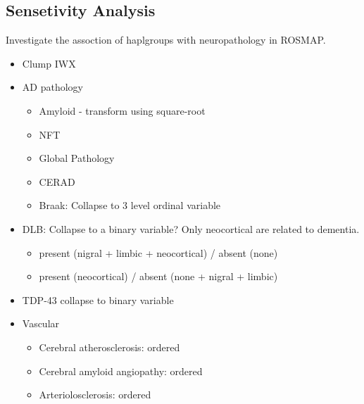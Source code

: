 \documentclass[]{book}
\providecommand{\tightlist}{%
  \setlength{\itemsep}{0pt}\setlength{\parskip}{0pt}}
\begin{document}
\hypertarget{sensetivity-analysis}{%
\subsection{Sensetivity Analysis}\label{sensetivity-analysis}}

Investigate the assoction of haplgroups with neuropathology in ROSMAP.

\begin{itemize}
\tightlist
\item
  Clump IWX
\item
  AD pathology

  \begin{itemize}
  \tightlist
  \item
    Amyloid - transform using square-root
  \item
    NFT
  \item
    Global Pathology
  \item
    CERAD
  \item
    Braak: Collapse to 3 level ordinal variable
  \end{itemize}
\item
  DLB: Collapse to a binary variable? Only neocortical are related to dementia.

  \begin{itemize}
  \tightlist
  \item
    present (nigral + limbic + neocortical) / absent (none)
  \item
    present (neocortical) / absent (none + nigral + limbic)
  \end{itemize}
\item
  TDP-43 collapse to binary variable
\item
  Vascular

  \begin{itemize}
  \tightlist
  \item
    Cerebral atherosclerosis: ordered
  \item
    Cerebral amyloid angiopathy: ordered
  \item
    Arteriolosclerosis: ordered
  \end{itemize}
\end{itemize}
\end{document}
